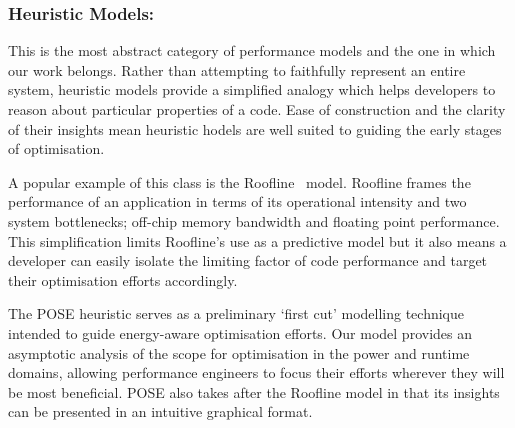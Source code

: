 \subsubsection{Heuristic Models:}
This is the most abstract category of performance models and the one in which our work belongs.
Rather than attempting to faithfully represent an entire system, heuristic models provide a simplified analogy which helps developers to reason about particular properties of a code.
Ease of construction and the clarity of their insights mean heuristic hodels are well suited to guiding the early stages of optimisation.

A popular example of this class is the Roofline~\cite{williams:2009aa} model.
Roofline frames the performance of an application in terms of its operational intensity and two system bottlenecks; off-chip memory bandwidth and floating point performance.
This simplification limits Roofline's use as a predictive model but it also means a developer can easily isolate the limiting factor of code performance and target their optimisation efforts accordingly.

The POSE heuristic serves as a preliminary `first cut' modelling technique intended to guide energy-aware optimisation efforts.
Our model provides an asymptotic analysis of the scope for optimisation in the power and runtime domains, allowing performance engineers to focus their efforts wherever they will be most beneficial.
POSE also takes after the Roofline model in that its insights can be presented in an intuitive graphical format.
